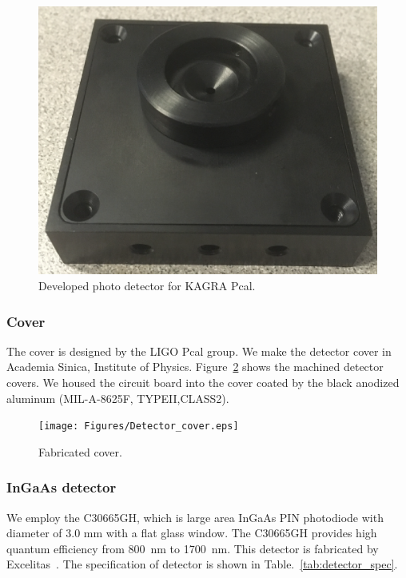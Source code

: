\begin{figure}
\begin{center}
\includegraphics[width=12cm]{Figures/KAGRA_detector.eps}
\caption{Developed photo detector for KAGRA Pcal.} 
\label{fig:KAGRA_photodetector} 
\end{center}
\end{figure}

\subsubsection{Cover}
The cover is designed by the LIGO Pcal group. We make the detector cover in Academia Sinica, Institute of Physics. Figure~\ref{fig:detector_cover} shows the machined detector covers. We housed the circuit board into the cover coated by the black anodized aluminum (MIL-A-8625F, TYPEII,CLASS2). 

\begin{figure}
\begin{center}
\texttt{[image: Figures/Detector\_cover.eps]}
\caption{Fabricated cover.} 
\label{fig:detector_cover} 
\end{center}
\end{figure}

\subsubsection{InGaAs detector}	
We employ the C30665GH, which is large area InGaAs PIN photodiode with diameter of 3.0 mm with a flat glass window. The C30665GH provides high quantum efficiency from 800~nm to 1700~nm. This detector is fabricated by Excelitas~\cite{Excelitas}. The specification of detector is shown in Table.~\ref{tab:detector_spec}.

